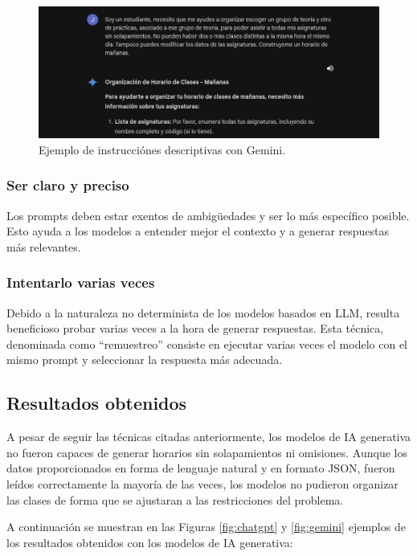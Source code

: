 \begin{figure}[H]
    \centering
    \includegraphics[width=1\textwidth]{./imagenes/Gemini_contexto.png}
    \caption{Ejemplo de instrucciónes descriptivas con Gemini.}
    \label{fig:contexto}
\end{figure}


\subsubsection*{Ser claro y preciso}
Los prompts deben estar exentos de ambigüedades y ser lo más específico posible. Esto ayuda a los modelos a entender mejor el contexto y a generar respuestas más relevantes.

\subsubsection*{Intentarlo varias veces}
Debido a la naturaleza no determinista de los modelos basados en LLM, resulta beneficioso probar varias veces a la hora de generar respuestas. Esta técnica, denominada como ``remuestreo'' consiste en ejecutar varias veces el modelo con el mismo prompt y seleccionar la respuesta más adecuada.

\subsection{Resultados obtenidos}

A pesar de seguir las técnicas citadas anteriormente, los modelos de IA generativa no fueron capaces de generar horarios sin solapamientos ni omisiones. Aunque los datos proporcionados en forma de lenguaje natural y en formato JSON, fueron leídos correctamente la mayoría de las veces, los modelos no pudieron organizar las clases de forma que se ajustaran a las restricciones del problema.\newline

A continuación se muestran en las Figuras \ref{fig:chatgpt} y \ref{fig:gemini} ejemplos de los resultados obtenidos con los modelos de IA generativa:

